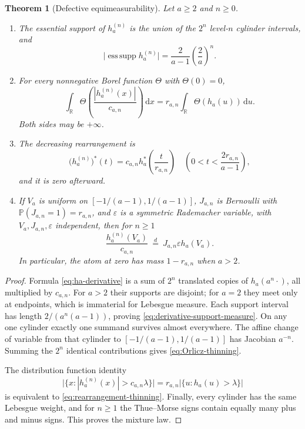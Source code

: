 \documentclass[11pt,oneside]{article}
\newtheorem{theorem}{Theorem}[section]
\theoremstyle{definition}
\theoremstyle{remark}
\newcommand{\R}{\mathbb R}
\newcommand{\dd}{\,\mathrm d}
\newcommand{\Prob}{\mathbb P}
\begin{document}
\begin{theorem}[Defective equimeasurability]
\label{thm:defective-equimeasurability}
Let $a\ge2$ and $n\ge0$.
\begin{enumerate}
\item The essential support of $h_a^{(n)}$ is the union of the $2^n$ level-$n$ cylinder
      intervals, and
      \begin{equation}
       \bigl|\operatorname*{ess\,supp}h_a^{(n)}\bigr|
       =\frac{2}{a-1}\left(\frac2a\right)^n.
       \label{eq:derivative-support-measure}
      \end{equation}
\item For every nonnegative Borel function $\Theta$ with $\Theta(0)=0$,
      \begin{equation}
       \boxed{\quad
       \int_{\R}\Theta\!\left(\frac{|h_a^{(n)}(x)|}{c_{a,n}}\right)\dd x
       =r_{a,n}\int_{\R}\Theta(h_a(u))\dd u.
       \quad}
       \label{eq:Orlicz-thinning}
      \end{equation}
      Both sides may be $+\infty$.
\item The decreasing rearrangement is
      \begin{equation}
       \bigl(h_a^{(n)}\bigr)^*(t)
       =c_{a,n}h_a^*\!\left(\frac{t}{r_{a,n}}\right)
       \quad\left(0<t<\frac{2r_{a,n}}{a-1}\right),
       \label{eq:rearrangement-thinning}
      \end{equation}
      and it is zero afterward.
\item If $V_a$ is uniform on $[-1/(a-1),1/(a-1)]$, $J_{a,n}$ is Bernoulli with
      $\Prob(J_{a,n}=1)=r_{a,n}$, and $\varepsilon$ is a symmetric Rademacher variable,
      with $V_a,J_{a,n},\varepsilon$ independent, then for $n\ge1$
      \begin{equation}
       \frac{h_a^{(n)}(V_a)}{c_{a,n}}
       \ \stackrel{d}{=}\ J_{a,n}\varepsilon h_a(V_a).
       \label{eq:signed-mixture-law}
      \end{equation}
      In particular, the atom at zero has mass $1-r_{a,n}$ when $a>2$.
\end{enumerate}
\end{theorem}

\begin{proof}
Formula \eqref{eq:ha-derivative} is a sum of $2^n$ translated copies of $h_a(a^n\cdot)$,
all multiplied by $c_{a,n}$.  For $a>2$ their supports are disjoint; for $a=2$ they meet only
at endpoints, which is immaterial for Lebesgue measure.  Each support interval has length
$2/(a^n(a-1))$, proving \eqref{eq:derivative-support-measure}.  On any one cylinder exactly one
summand survives almost everywhere.  The affine change of variable from that cylinder to
$[-1/(a-1),1/(a-1)]$ has Jacobian $a^{-n}$.  Summing the $2^n$ identical contributions gives
\eqref{eq:Orlicz-thinning}.

The distribution function identity
\[
 \bigl|\{x:|h_a^{(n)}(x)|>c_{a,n}\lambda\}\bigr|
 =r_{a,n}\bigl|\{u:h_a(u)>\lambda\}\bigr|
\]
is equivalent to \eqref{eq:rearrangement-thinning}.  Finally, every cylinder has the same
Lebesgue weight, and for $n\ge1$ the Thue--Morse signs contain equally many plus and minus signs.
This proves the mixture law.
\end{proof}
\end{document}

